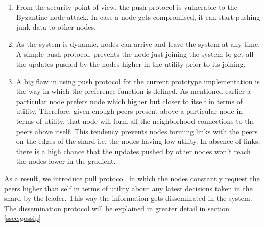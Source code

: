 \documentclass[12pt,a4paper,twoside,openright]{book}
\begin{document}
\begin{enumerate}

\item From the security point of view, the push protocol is vulnerable to the Byzantine node attack. In case a node gets compromised, it can start pushing junk data to other nodes.


\item As the system is dynamic, nodes can arrive and leave the system at any time. A simple push protocol, prevents the node just joining the system to get all the updates pushed by the nodes higher in the utility prior to its joining.

\item A big flaw in using push protocol for the current prototype implementation is the way in which the preference function is defined. As mentioned earlier a particular node prefers node which higher but closer to itself in terms of utility. Therefore, given enough peers present above a particular node in terms of utility, that node will form all the neighborhood connections to the peers above itself. This tendency prevents nodes forming links with the peers on the edges of the shard i.e. the nodes having low utility. In absence of links, there is a high chance that the updates pushed by other nodes won't reach the nodes lower in the gradient.

\end{enumerate} 

As a result, we introduce pull protocol, in which the nodes constantly request the peers higher than self in terms of utility about any latest decisions taken in the shard by the leader. This way the information gets disseminated in the system. The dissemination protocol will be explained in greater detail in section \ref{ssec:gossip}
\end{document}
